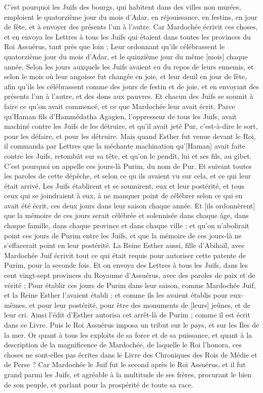 \begin{multicols}{2}
C'est pourquoi les Juifs des bourgs, qui habitent dans des villes non murées, emploient le quatorzième jour du mois d'Adar, en réjouissance, en festins, en jour de fête, et à envoyer des présents l'un à l'autre.
Car Mardochée écrivit ces choses, et en envoya les Lettres à tous les Juifs qui étaient dans toutes les provinces du Roi Assuérus, tant près que loin ;
Leur ordonnant qu'ils célébrassent le quatorzième jour du mois d'Adar, et le quinzième jour du même [mois] chaque année.
Selon les jours auxquels les Juifs avaient eu du repos de leurs ennemis, et selon le mois où leur angoisse fut changée en joie, et leur deuil en jour de fête, afin qu'ils les célébrassent comme des jours de festin et de joie, et en envoyant des présents l'un à l'autre, et des dons aux pauvres.
Et chacun des Juifs se soumit à faire ce qu'on avait commencé, et ce que Mardochée leur avait écrit.
Parce qu'Haman fils d'Hammédatha Agagien, l'oppresseur de tous les Juifs, avait machiné contre les Juifs de les détruire, et qu'il avait jeté Pur, c'est-à-dire le sort, pour les défaire, et pour les détruire.
Mais quand Esther fut venue devant le Roi, il commanda par Lettres que la méchante machination qu'[Haman] avait faite contre les Juifs, retombât sur sa tête, et qu'on le pendît, lui et ses fils, au gibet.
C'est pourquoi on appelle ces jours-là Purim, du nom de Pur. Et suivant toutes les paroles de cette dépêche, et selon ce qu ils avaient vu sur cela, et ce qui leur était arrivé,
Les Juifs établirent et se soumirent, eux et leur postérité, et tous ceux qui se joindraient à eux, à ne manquer point de célébrer selon ce qui en avait été écrit, ces deux jours dans leur saison chaque année.
Et [ils ordonnèrent] que la mémoire de ces jours serait célébrée et solennisée dans chaque âge, dans chaque famille, dans chaque province et dans chaque ville ; et qu'on n'abolirait point ces jours de Purim entre les Juifs, et que la mémoire de ces jours-là ne s'effacerait point en leur postérité.
La Reine Esther aussi, fille d'Abihaïl, avec Mardochée Juif écrivit tout ce qui était requis pour autoriser cette patente de Purim, pour la seconde fois.
Et on envoya des Lettres à tous les Juifs, dans les cent vingt-sept provinces du Royaume d'Assuérus, avec des paroles de paix et de vérité ;
Pour établir ces jours de Purim dans leur saison, comme Mardochée Juif, et la Reine Esther l'avaient établi ; et comme ils les avaient établis pour eux-mêmes, et pour leur postérité, pour être des monuments de [leurs] jeûnes, et de leur cri.
Ainsi l'édit d'Esther autorisa cet arrêt-là de Purim ; comme il est écrit dans ce Livre.
\VerseOne{}Puis le Roi Assuérus imposa un tribut sur le pays, et sur les Iles de la mer.
Or quant à tous les exploits de sa force et de sa puissance, et quant à la description de la magnificence de Mardochée, de laquelle le Roi l'honora, ces choses ne sont-elles pas écrites dans le Livre des Chroniques des Rois de Médie et de Perse ?
Car Mardochée le Juif fut le second après le Roi Assuérus, et il fut grand parmi les Juifs, et agréable à la multitude de ses frères, procurant le bien de son peuple, et parlant pour la prospérité de toute sa race.
\PPE{}
\end{multicols}
